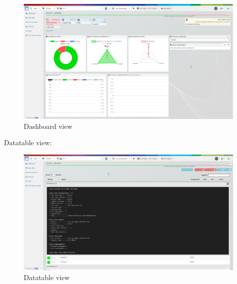 \begin{figure}[h!]
  \includegraphics[width=1\linewidth]{./pictures/Dashboard.png}
  \caption{Dashboard view}
\end{figure}

Datatable view:

\begin{figure}[h!]
  \includegraphics[width=1\linewidth]{./pictures/Datatable.png}
  \caption{Datatable view}
\end{figure}
